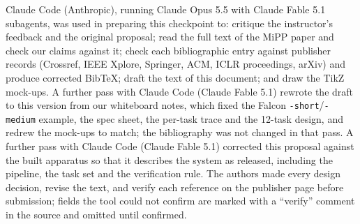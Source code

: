 \documentclass[sigconf,nonacm]{acmart}
\begin{document}
Claude Code (Anthropic), running Claude Opus 5.5 with Claude Fable 5.1
subagents, was used in preparing this checkpoint to: critique the
instructor's feedback and the original proposal; read the full text of the
MiPP paper and check our claims against it; check each bibliographic entry
against publisher records (Crossref, IEEE Xplore, Springer, ACM, ICLR
proceedings, arXiv) and produce corrected BibTeX; draft the text of this
document; and draw the TikZ mock-ups. A further pass with Claude Code
(Claude Fable 5.1) rewrote the draft to this version from our whiteboard
notes, which fixed the Falcon \texttt{-short}/\texttt{-medium} example,
the spec sheet, the per-task trace and the 12-task design, and redrew the
mock-ups to match; the bibliography was not changed in that pass. A further pass with
Claude Code (Claude Fable 5.1) corrected this proposal against the built
apparatus so that it describes the system as released, including the
pipeline, the task set and the verification rule. The
authors made every design decision, revise the text, and verify each
reference on the publisher page before submission; fields the tool could
not confirm are marked with a ``verify'' comment in the source and omitted
until confirmed.



\end{document}
